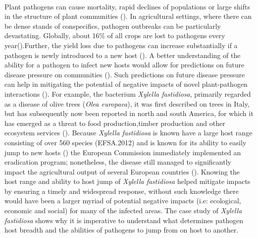\documentclass[12pt,letter]{article}
\begin{document}
\paragraph{}Plant pathogens can cause mortality, rapid declines of populations or large shifts in the structure of plant communities (\cite{Gilbert2002}). In agricultural settings, where there can be dense stands of conspecifics, pathogen outbreaks can be particularly devastating. Globally, about 16\% of all crops are lost to pathogens every year(\cite{Oerke2006}).Further, the yield loss due to pathogens can increase substantially if a pathogen is newly introduced to a new host (\cite{Oerke2006}).     
A better understanding of the ability for a pathogen to infect new hosts would allow for predictions on future disease pressure on communities (\cite{Borer2016}). Such predictions on future disease pressure can help in mitigating the potential of negative impacts of novel plant-pathogen interactions (\cite{Parker2015}). For example, the bacterium \textit{Xylella fastidiosa}, primarily regarded as a disease of olive trees (\textit{Olea europaea}), it was first described on trees in Italy, but has subsequently now been reported in north and south America, for which it has emerged as a threat to food production,timber production and other ecosystem services (\cite{Almeida2019}). Because \textit{Xylella fastidiosa} is known have a large host range consisting of over 560 species (EFSA.2012) and is known for its ability to easily jump to new hosts (\cite{Sicard2018}) the European Commission immediately implemented an eradication program; nonetheless, the disease still managed to significantly impact the agricultural output of several European countries (\cite{Almeida2019}). Knowing the host range and ability to host jump of \textit{Xylella fastidiosa} helped mitigate impacts by ensuring a timely and widespread response, without such knowledge there would have been a larger myriad of potential negative impacts (i.e: ecological, economic and social) for many of the infected areas.  The case study of \textit{Xylella fastidiosa} shows why it is imperative to understand what determines pathogen host breadth and the abilities of pathogens to jump from on host to another.

\end{document}
